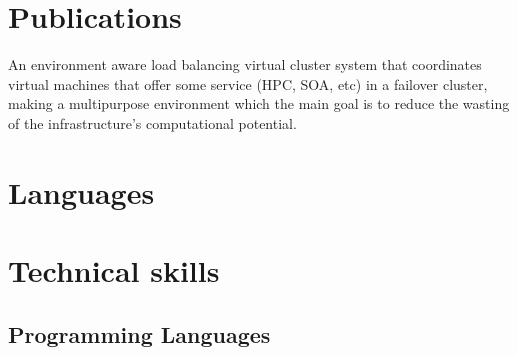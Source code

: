 \documentclass[11pt, a4paper, sans]{moderncv} %
\begin{document}
\section{Publications}
{
An environment aware load balancing virtual cluster system that coordinates virtual machines that offer some service (HPC, SOA, etc) in a failover cluster, making a multipurpose environment which the main goal is to reduce the wasting of the infrastructure's computational potential. 
}












\section{Languages}










\section{Technical skills}

\subsection{Programming Languages}
\end{document}
